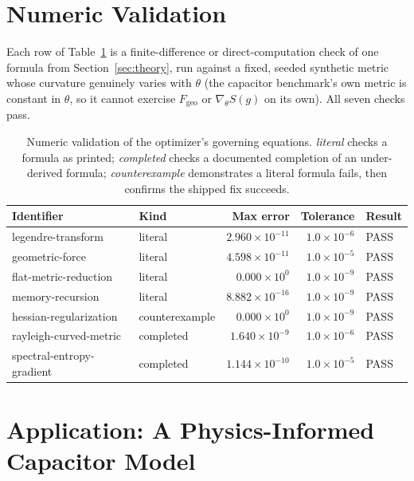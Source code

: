 \documentclass[11pt]{article}
\begin{document}
\section{Numeric Validation}
\label{sec:validation}

Each row of Table~\ref{tab:numeric-checks} is a finite-difference or direct-computation
check of one formula from Section~\ref{sec:theory}, run against a fixed, seeded synthetic
metric whose curvature genuinely varies with $\theta$ (the capacitor benchmark's own metric
is constant in $\theta$, so it cannot exercise $F_{\mathrm{geo}}$ or $\nabla_\theta S(g)$ on
its own). All seven checks pass.

\begin{table}[htbp]
\centering
\small
\begin{tabular}{@{}llrrl@{}}
\toprule
\textbf{Identifier} & \textbf{Kind} & \textbf{Max error} & \textbf{Tolerance} & \textbf{Result} \\
\midrule
legendre-transform & literal & $2.960\times10^{-11}$ & $1.0\times10^{-6}$ & \textcolor{green!50!black}{PASS} \\
geometric-force & literal & $4.598\times10^{-11}$ & $1.0\times10^{-5}$ & \textcolor{green!50!black}{PASS} \\
flat-metric-reduction & literal & $0.000\times10^{0}$ & $1.0\times10^{-9}$ & \textcolor{green!50!black}{PASS} \\
memory-recursion & literal & $8.882\times10^{-16}$ & $1.0\times10^{-9}$ & \textcolor{green!50!black}{PASS} \\
hessian-regularization & counterexample & $0.000\times10^{0}$ & $1.0\times10^{-9}$ & \textcolor{green!50!black}{PASS} \\
rayleigh-curved-metric & completed & $1.640\times10^{-9}$ & $1.0\times10^{-6}$ & \textcolor{green!50!black}{PASS} \\
spectral-entropy-gradient & completed & $1.144\times10^{-10}$ & $1.0\times10^{-5}$ & \textcolor{green!50!black}{PASS} \\
\bottomrule
\end{tabular}
\caption{Numeric validation of the optimizer's governing equations. \emph{literal}
checks a formula as printed; \emph{completed} checks a documented completion of an
under-derived formula; \emph{counterexample} demonstrates a literal formula fails, then
confirms the shipped fix succeeds.}
\label{tab:numeric-checks}
\end{table}

\section{Application: A Physics-Informed Capacitor Model}
\label{sec:capacitor}
\end{document}
